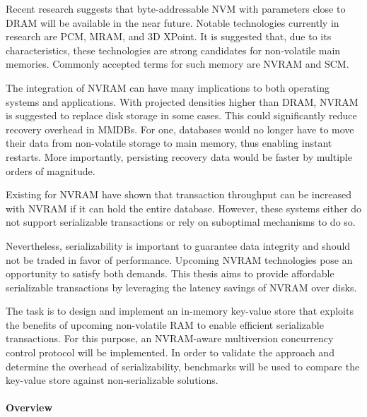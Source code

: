 Recent research suggests that byte-addressable \ac{NVM} with parameters close to
\ac{DRAM} will be available in the near future. Notable technologies currently
in research are \ac{PCM}, \ac{MRAM}, and 3D XPoint. It is suggested that, due to
its characteristics, these technologies are strong candidates for non-volatile
main memories. Commonly accepted terms for such memory are \ac{NVRAM} and
\ac{SCM}.


The integration of \ac{NVRAM} can have many implications to both operating
systems and applications. With projected densities higher than \ac{DRAM},
\ac{NVRAM} is suggested to replace disk storage in some cases. This could
significantly reduce recovery overhead in \acp{MMDB}. For one, databases would
no longer have to move their data from non-volatile storage to main memory, thus
enabling instant restarts. More importantly, persisting recovery data would be
faster by multiple orders of magnitude.

Existing \kvsp for \ac{NVRAM} have shown that transaction throughput can be
increased with \ac{NVRAM} if it can hold the entire database. However, these
systems either do not support serializable transactions or rely on suboptimal
mechanisms to do so.

Nevertheless, serializability is important to guarantee data integrity and
should not be traded in favor of performance. Upcoming NVRAM technologies pose
an opportunity to satisfy both demands. This thesis aims to provide affordable
serializable transactions by leveraging the latency savings of \ac{NVRAM} over
disks.



The task is to design and implement an in-memory key-value store that exploits
the benefits of upcoming non-volatile RAM to enable efficient serializable
transactions. For this purpose, an NVRAM-aware multiversion concurrency control
protocol will be implemented. In order to validate the approach and determine
the overhead of serializability, benchmarks will be used to compare the
key-value store against non-serializable solutions.


\paragraph{Overview}

